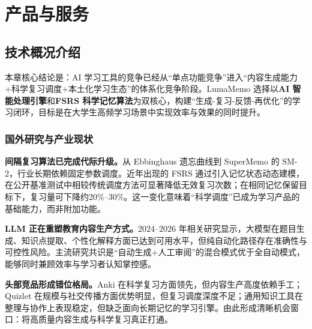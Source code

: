 
\chapter{产品与服务}

\section{技术概况介绍}

本章核心结论是：AI 学习工具的竞争已经从“单点功能竞争”进入“内容生成能力+科学复习调度+本土化学习生态”的体系化竞争阶段。LumaMemo 选择以\textbf{AI 智能处理引擎}和\textbf{FSRS 科学记忆算法}为双核心，构建“生成-复习-反馈-再优化”的学习闭环，目标是在大学生高频学习场景中实现效率与效果的同时提升。

\subsection{国外研究与产业现状}

\textbf{间隔复习算法已完成代际升级。}从 Ebbinghaus 遗忘曲线到 SuperMemo 的 SM-2，行业长期依赖固定参数调度。近年出现的 FSRS 通过引入记忆状态动态建模，在公开基准测试中相较传统调度方法可显著降低无效复习次数；在相同记忆保留目标下，复习量可下降约20\%--30\%。这一变化意味着“科学调度”已成为学习产品的基础能力，而非附加功能。

\textbf{LLM 正在重塑教育内容生产方式。}2024--2026 年相关研究显示，大模型在题目生成、知识点提取、个性化解释方面已达到可用水平，但纯自动化路径存在准确性与可控性风险。主流研究共识是“自动生成+人工审阅”的混合模式优于全自动模式，能够同时兼顾效率与学习者认知掌控感。

\textbf{头部竞品形成错位格局。}Anki 在科学复习方面领先，但内容生产高度依赖手工；Quizlet 在规模与社交传播方面优势明显，但复习调度深度不足；通用知识工具在整理与协作上表现稳定，但缺乏面向长期记忆的学习引擎。由此形成清晰机会窗口：将高质量内容生成与科学复习真正打通。

